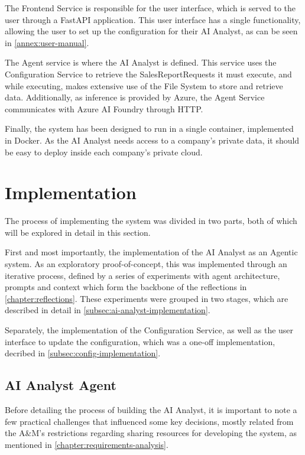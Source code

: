 \documentclass[a4paper]{report}
\begin{document}
The Frontend Service is responsible for the user interface, which is served to the user through a FastAPI application. This user interface has a single functionality, allowing the user to set up the configuration for their AI Analyst, as can be seen in \autoref{annex:user-manual}. 

The Agent service is where the AI Analyst is defined. This service uses the Configuration Service to retrieve the SalesReportRequests it must execute, and while executing, makes extensive use of the File System to store and retrieve data. Additionally, as inference is provided by Azure, the Agent Service communicates with Azure AI Foundry through HTTP.

Finally, the system has been designed to run in a single container, implemented in Docker. As the AI Analyst needs access to a company's private data, it should be easy to deploy inside each company's private cloud.

\section{Implementation}
\label{sec:implementation}

The process of implementing the system was divided in two parts, both of which will be explored in detail in this section.

First and most importantly, the implementation of the AI Analyst as an Agentic system. As an exploratory proof-of-concept, this was implemented through an iterative process, defined by a series of experiments with agent architecture, prompts and context which form the backbone of the reflections in \autoref{chapter:reflections}. These experiments were grouped in two stages, which are described in detail in \autoref{subsec:ai-analyst-implementation}.

Separately, the implementation of the Configuration Service, as well as the user interface to update the configuration, which was a one-off implementation, decribed in \autoref{subsec:config-implementation}.

\subsection{AI Analyst Agent}
\label{subsec:ai-analyst-implementation}

Before detailing the process of building the AI Analyst, it is important to note a few practical challenges that influenced some key decisions, mostly related from the A\&M's restrictions regarding sharing resources for developing the system, as mentioned in \autoref{chapter:requirements-analysis}.
\end{document}
